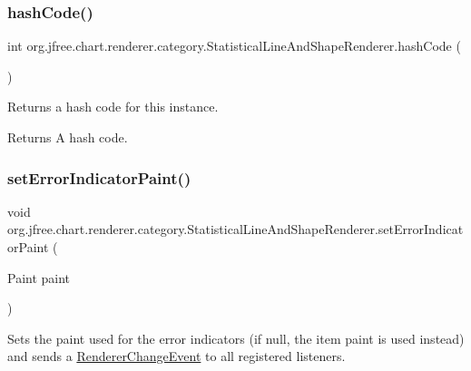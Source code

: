 \subsubsection{\texorpdfstring{hash\+Code()}{hashCode()}}
{\footnotesize\ttfamily int org.\+jfree.\+chart.\+renderer.\+category.\+Statistical\+Line\+And\+Shape\+Renderer.\+hash\+Code (\begin{DoxyParamCaption}{ }\end{DoxyParamCaption})}

Returns a hash code for this instance.

\begin{DoxyReturn}{Returns}
A hash code. 
\end{DoxyReturn}
\mbox{\label{classorg_1_1jfree_1_1chart_1_1renderer_1_1category_1_1_statistical_line_and_shape_renderer_a7053e48faecf8eabb4ab8e5648ca115c}} 
\subsubsection{\texorpdfstring{set\+Error\+Indicator\+Paint()}{setErrorIndicatorPaint()}}
{\footnotesize\ttfamily void org.\+jfree.\+chart.\+renderer.\+category.\+Statistical\+Line\+And\+Shape\+Renderer.\+set\+Error\+Indicator\+Paint (\begin{DoxyParamCaption}\item[{Paint}]{paint }\end{DoxyParamCaption})}

Sets the paint used for the error indicators (if {\ttfamily null}, the item paint is used instead) and sends a \mbox{\hyperlink{}{Renderer\+Change\+Event}} to all registered listeners.


